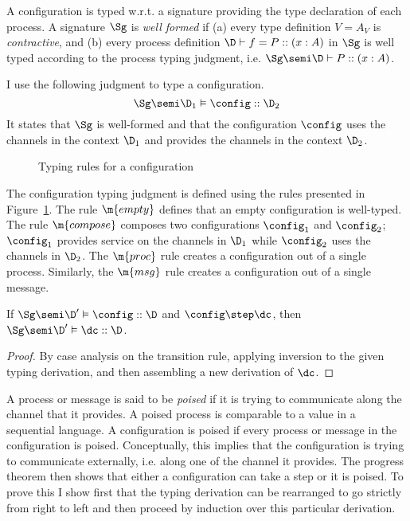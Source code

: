 A configuration is typed w.r.t. a signature providing the type declaration
of each process.
A signature $\Sg$ is \emph{well formed} if
(a) every type definition $V = A_V$ is \emph{contractive},
and (b) every process definition
$\D \vdash f = P :: (x : A)$ in $\Sg$
is well typed according to the process typing judgment, i.e.
$\Sg \semi \D \vdash P :: (x : A)$.

I use the following judgment to type a configuration.
\[
\Sg \semi \D_1 \vDash \config :: \D_2
\]
It states that $\Sg$ is well-formed
and that the configuration $\config$
uses the channels in the context $\D_1$ and provides
the channels in the context $\D_2$.
\begin{figure}[t]
\caption{Typing rules for a configuration}
\label{fig:config_typing}
\end{figure}
The configuration typing judgment is defined using
the rules presented in Figure~\ref{fig:config_typing}.
%
The rule $\m{empty}$ defines that an empty configuration
is well-typed. The rule $\m{compose}$
composes two
configurations $\config_1$ and $\config_2$; $\config_1$ provides
service on the channels in $\D_1$ while $\config_2$ uses
the channels in $\D_2$. The $\m{proc}$ rule creates a configuration
out of a single process. Similarly, the $\m{msg}$ rule creates a
configuration out of a single message.

\begin{theorem}
\label{thm:preservation}
If $\Sg \semi \D' \vDash \config :: \D$ and $\config \step \dc$,
then $\Sg \semi \D' \vDash \dc :: \D$.
\end{theorem}
\begin{proof}
  By case analysis on the transition rule, applying inversion to the
  given typing derivation, and then assembling a new derivation of
  $\dc$.
\end{proof}

A process or message is said to be \emph{poised} if it is trying to
communicate along the channel that it provides.  A poised process is
comparable to a value in a sequential language. A configuration is
poised if every process or message in the configuration is poised.
Conceptually, this implies that the configuration is trying to communicate
externally, i.e. along one of the channel it provides.
The progress theorem then shows that either a configuration can take a
step or it is poised.  To prove this I show first that the typing
derivation can be rearranged to go strictly from right to left and
then proceed by induction over this particular derivation.

